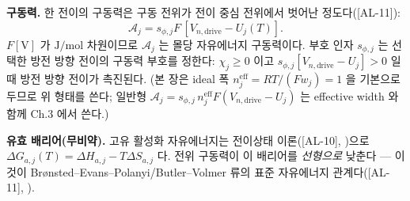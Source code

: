 \documentclass[11pt,a4paper]{article}
\newcommand{\eff}{\mathrm{eff}}
\newcommand{\drive}{\mathrm{drive}}
\newcommand{\AL}[1]{\textsf{[AL-#1]}}
\begin{document}
\textbf{구동력.} 한 전이의 구동력은 구동 전위가 전이 중심 전위에서 벗어난 정도다(\AL{11}):
\begin{equation}
\mathcal A_j=s_{\phi,j}F\,[V_{n,\drive}-U_j(T)].
\label{eq:Aj}
\end{equation}
$F[\mathrm V]$ 가 $\mathrm{J/mol}$ 차원이므로 $\mathcal A_j$ 는 몰당 자유에너지 구동력이다. 부호 인자
$s_{\phi,j}$ 는 선택한 방전 방향 전이의 구동력 부호를 정한다: $\chi_j\ge0$ 이고 $s_{\phi,j}[V_{n,\drive}-U_j]>0$
일 때 방전 방향 전이가 촉진된다. (본 장은 ideal 폭 $n_j^{\eff}=RT/(Fw_j)=1$ 을 기본으로 두므로 위 형태를 쓴다;
일반형 $\mathcal A_j=s_{\phi,j}\,n_j^{\eff}F(V_{n,\drive}-U_j)$ 는 effective width 와 함께 Ch.3 에서 쓴다.)

\textbf{유효 배리어(무비약).} 고유 활성화 자유에너지는 전이상태 이론(\AL{10}, \cite{eyring1935})으로
$\Delta G_{a,j}(T)=\Delta H_{a,j}-T\Delta S_{a,j}$ 다. 전위 구동력이 이 배리어를 \emph{선형으로} 낮춘다 —
이것이 Brønsted--Evans--Polanyi/Butler--Volmer 류의 표준 자유에너지 관계다(\AL{11},
\cite{evanspolanyi1938,bardfaulkner,bazant2013}).
\end{document}
